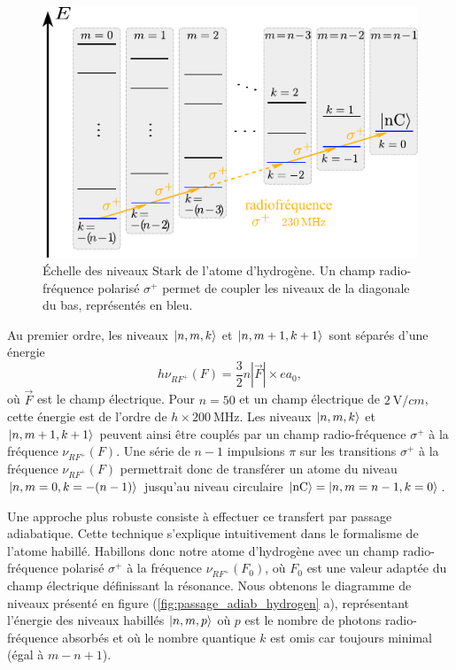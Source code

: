 \begin{figure}[h]
\centering
\includegraphics[width=.8\linewidth]{figures/circulars/sigmap_hydrogen}
\caption[Échelle des niveaux Stark de l'atome d'hydrogène]{
Échelle des niveaux Stark de l'atome d'hydrogène.
Un champ radio-fréquence polarisé $\sigma^+$ permet de coupler les niveaux de la diagonale du bas, représentés en bleu.
}
\label{fig:sigmap_hydrogen}
\end{figure} 

\clearpage
Au premier ordre, les niveaux $\ket{n,m,k}$ et $\ket{n,m+1,k+1}$ sont séparés d'une énergie
\begin{equation}
h\nu_{RF^+}(F) = \frac{3}{2}n|\vec{F}|\times ea_0 , %
\end{equation}
où $\vec{F}$ est le champ électrique. %
Pour $n=50$ et un champ électrique de $\SI{2}{\V/cm}$, cette énergie est de l'ordre de $h\times\SI{200}{\MHz}$.
Les niveaux $\ket{n,m,k}$ et $\ket{n,m+1,k+1}$ peuvent ainsi être couplés par un champ radio-fréquence $\sigma^+$ à la fréquence $\nu_{RF^+}(F)$.
Une série de $n-1$ impulsions $\pi$ sur les transitions $\sigma^+$ à la fréquence $\nu_{RF^+}(F)$ permettrait donc de transférer un atome du niveau $\ket{n,m=0,k=-(n-1)}$ jusqu'au niveau circulaire $\ket{\mathrm{nC}}=\ket{n,m=n-1,k=0}$.

Une approche plus robuste consiste à effectuer ce transfert par passage adiabatique.
Cette technique s'explique intuitivement dans le formalisme de l'atome habillé.
Habillons donc notre atome d'hydrogène avec un champ radio-fréquence polarisé $\sigma^+$ à la fréquence $\nu_{RF^+}(F_0)$, où $F_0$ est une valeur adaptée du champ électrique définissant la résonance.
Nous obtenons le diagramme de niveaux présenté en figure (\ref{fig:passage_adiab_hydrogen} a), représentant l'énergie des niveaux habillés $\ket{n,m,p}$ où $p$ est le nombre de photons radio-fréquence absorbés et où le nombre quantique $k$ est omis car toujours minimal (égal à $m-n+1$).

